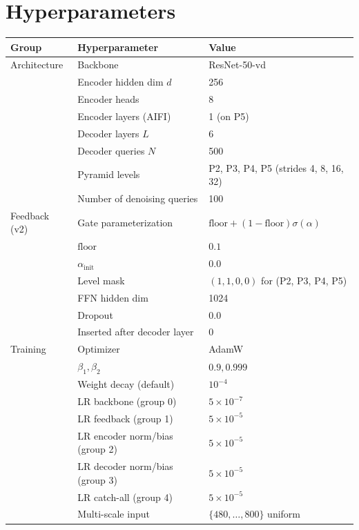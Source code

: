 \section{Hyperparameters}
\label{app:hyper}

\begin{table}[H]
\centering
\small
\begin{tabular}{lll}
    \toprule
    \textbf{Group} & \textbf{Hyperparameter} & \textbf{Value} \\
    \midrule
    Architecture & Backbone & ResNet-50-vd \\
    & Encoder hidden dim $d$ & 256 \\
    & Encoder heads & 8 \\
    & Encoder layers (AIFI) & 1 (on P5) \\
    & Decoder layers $L$ & 6 \\
    & Decoder queries $N$ & 500 \\
    & Pyramid levels & P2, P3, P4, P5 (strides 4, 8, 16, 32) \\
    & Number of denoising queries & 100 \\
    \midrule
    Feedback (v2) & Gate parameterization & $\mathrm{floor} + (1-\mathrm{floor})\sigma(\alpha)$ \\
    & $\mathrm{floor}$ & $0.1$ \\
    & $\alpha_{\mathrm{init}}$ & $0.0$ \\
    & Level mask & $(1, 1, 0, 0)$ for (P2, P3, P4, P5) \\
    & FFN hidden dim & 1024 \\
    & Dropout & 0.0 \\
    & Inserted after decoder layer & 0 \\
    \midrule
    Training & Optimizer & AdamW \\
    & $\beta_1, \beta_2$ & $0.9, 0.999$ \\
    & Weight decay (default) & $10^{-4}$ \\
    & LR backbone (group 0) & $5 \times 10^{-7}$ \\
    & LR feedback (group 1) & $5 \times 10^{-5}$ \\
    & LR encoder norm/bias (group 2) & $5 \times 10^{-5}$ \\
    & LR decoder norm/bias (group 3) & $5 \times 10^{-5}$ \\
    & LR catch-all (group 4) & $5 \times 10^{-5}$ \\
    & Multi-scale input & $\{480, \ldots, 800\}$ uniform \\

\end{tabular}
\end{table}
